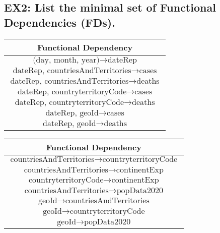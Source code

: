 \documentclass{article}
\begin{document}
\subsection*{EX2: List the minimal set of Functional Dependencies (FDs).}
\begin{minipage}{0.5\textwidth}
\begin{center}
\begin{tabular}{|c|}
  \hline
  \textbf{Functional Dependency} \\ [0.5ex]
  \hline
  $ \text{(day, month, year)} \rightarrow \text{dateRep}$\\ [0.5ex] 
  $ \text{dateRep, countriesAndTerritories} \rightarrow \text{cases}$\\ [0.5ex]
  $ \text{dateRep, countriesAndTerritories} \rightarrow \text{deaths}$\\ [0.5ex]
  $ \text{dateRep, countryterritoryCode} \rightarrow \text{cases}$\\ [0.5ex]
  $ \text{dateRep, countryterritoryCode} \rightarrow \text{deaths}$\\ [0.5ex]
  $ \text{dateRep, geoId} \rightarrow \text{cases}$\\ [0.5ex]
  $ \text{dateRep, geoId} \rightarrow \text{deaths}$\\ [0.5ex]

  \hline
\end{tabular}
\end{center}
\end{minipage}%
\begin{minipage}{0.5\textwidth}
\begin{center}
\begin{tabular}{|c|}
  \hline
  \textbf{Functional Dependency} \\ [0.5ex]
  \hline
  $ \text{countriesAndTerritories} \rightarrow \text{countryterritoryCode}$\\ [0.5ex]
  $ \text{countriesAndTerritories} \rightarrow \text{continentExp}$\\ [0.5ex]
  $ \text{countryterritoryCode} \rightarrow \text{continentExp}$\\ [0.5ex]
  $ \text{countriesAndTerritories} \rightarrow \text{popData2020}$\\ [0.5ex]
$ \text{geoId} \rightarrow \text{countriesAndTerritories}$\\ [0.5ex]
  $ \text{geoId} \rightarrow \text{countryterritoryCode}$\\ [0.5ex]
  $ \text{geoId} \rightarrow \text{popData2020}$\\ [0.5ex]
  \hline
\end{tabular}
\end{center}
\end{minipage}
\vspace{0.5cm}
\end{document}
